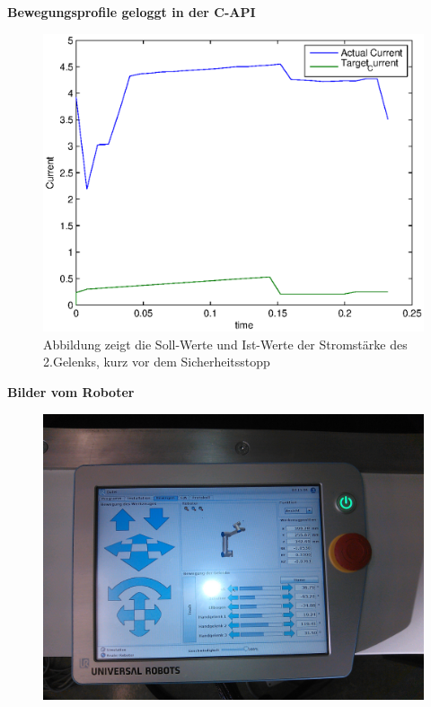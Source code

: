 \textbf{Bewegungsprofile geloggt in der C-API}

\begin{figure}[H]
  \centering
    \includegraphics[width=1\textwidth]{pic/joint1_current_capi.eps}
      \caption[Soll-und Ist-Werte der Stromstärke des 2.Gelenks]{Abbildung zeigt die Soll-Werte und Ist-Werte der Stromstärke des 2.Gelenks, kurz vor dem Sicherheitsstopp}
      \label{fig:joint_1_position_capi}
\end{figure}

\textbf{Bilder vom Roboter}

\begin{figure}[H]
  \centering
    \includegraphics[width=1\textwidth]{pic/tablet.jpg}
      \caption[Soll und Ist Werte der Position des 2.Gelenks]{}
      \label{fig:tablet_picture}
\end{figure}


